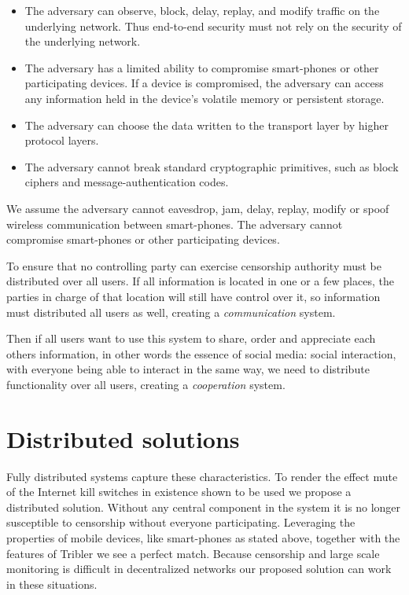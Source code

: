 \begin{itemize}
\item{
	The adversary can observe, block, delay, replay, and modify traffic on the underlying network.
	Thus end-to-end security must not rely on the security of the underlying network.
}
\item{
	The adversary has a limited ability to compromise smart-phones or other participating devices.
	If a device is compromised, the adversary can access any information held in the device's volatile memory or persistent storage.
}
\item{
	The adversary can choose the data written to the transport layer by higher protocol layers.
}
\item{
	The adversary cannot break standard cryptographic primitives, such as block ciphers and message-authentication codes.
}
\end{itemize}
We assume the adversary cannot eavesdrop, jam, delay, replay, modify or spoof wireless communication between smart-phones.
The adversary cannot compromise smart-phones or other participating devices.


To ensure that no controlling party can exercise censorship authority must be distributed over all users. %
If all information is located in one or a few places, the parties in charge of that location will still have control over it, so information must distributed all users as well, creating a \emph{communication} system.

Then if all users want to use this system to share, order and appreciate each others information, in other words the essence of social media: social interaction, with everyone being able to interact in the same way, we need to  distribute functionality over all users, creating a \emph{cooperation} system.


\section{Distributed solutions}
Fully distributed systems capture these characteristics.
To render the effect mute of the Internet kill switches in existence shown to be used we propose a distributed solution.
Without any central component in the system it is no longer susceptible to censorship without everyone participating.
Leveraging the properties of mobile devices, like smart-phones as stated above, together with the features of Tribler we see a perfect match.
Because censorship and large scale monitoring is difficult in decentralized networks our proposed solution can work in these situations.

